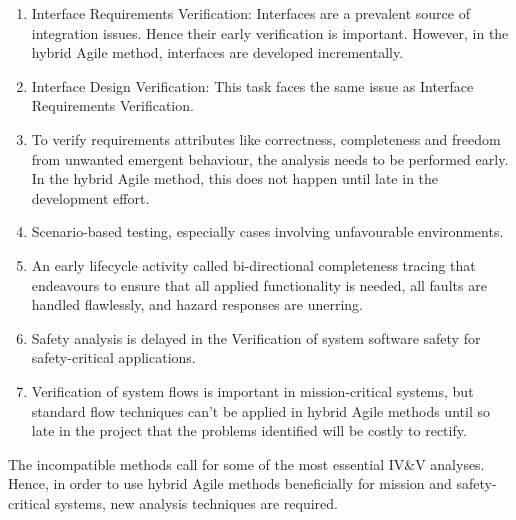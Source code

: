 \documentclass[journal, onecolumn]{IEEEtran}
\begin{document}
	\begin{enumerate}
		\item{Interface Requirements Verification: Interfaces are a prevalent source of integration issues. Hence their early verification is important. However, in the hybrid Agile method, interfaces are developed incrementally.}
		\item{Interface Design Verification: This task faces the same issue as Interface Requirements Verification.}
		\item{To verify requirements attributes like correctness, completeness and freedom from unwanted emergent behaviour, the analysis needs to be performed early. In the hybrid Agile method, this does not happen until late in the development effort.}
		\item{Scenario-based testing, especially cases involving unfavourable environments.}
		\item{An early lifecycle activity called bi-directional completeness tracing that endeavours to ensure that all applied functionality is needed, all faults are handled flawlessly, and hazard responses are unerring.}
		\item{Safety analysis is delayed in the Verification of system software safety for safety-critical applications.}
		\item{Verification of system flows is important in mission-critical systems, but standard flow techniques can’t be applied in hybrid Agile methods until so late in the project that the problems identified will be costly to rectify.}
	\end{enumerate}
	\bigskip
	The incompatible methods call for some of the most 
	essential IV\&V analyses.
	Hence, in order to use hybrid Agile methods beneficially for mission and safety-critical systems, new analysis techniques are required.
	
	
\end{document}
